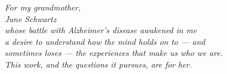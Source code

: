 
\vspace*{\fill}
\begin{center}
{\itshape
For my grandmother,\\[0.5em]
{\Large June Schwartz}\\[1.5em]
whose battle with Alzheimer's disease awakened in me\\
a desire to understand how the mind holds on to --- and\\
sometimes loses --- the experiences that make us who we are.\\[1.5em]
This work, and the questions it pursues, are for her.
}
\end{center}
\vspace*{\fill}
